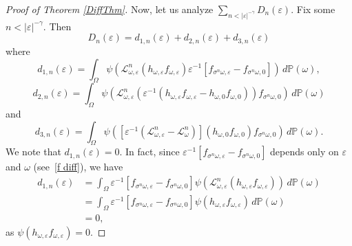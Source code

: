 \documentclass[11pt,reqno,a4paper]{article}
\theoremstyle{special}
\renewcommand{\epsilon}{\varepsilon}
\def\om{\omega}
\begin{document}
\begin{proof}[Proof of Theorem \ref{DiffThm}]
Now, let us analyze $\sum_{n<|\varepsilon|^{-\gamma}}D_n(\varepsilon)$. Fix some $n<|\varepsilon|^{-\gamma}$. 
Then 
$$
D_n(\varepsilon)=d_{1,n}(\varepsilon)+d_{2,n}(\varepsilon)+d_{3,n}(\varepsilon)
$$
where 
$$
d_{1,n}(\varepsilon)=\int_\Omega \psi(\mathcal L_{\omega,\varepsilon}^n(h_{\om, \varepsilon}f_{\om, \varepsilon})\varepsilon^{-1}[f_{\sigma^n\om, \varepsilon}-f_{\sigma^n\om, 0}]) \, d\mathbb P(\om),
$$
$$
d_{2,n}(\varepsilon)=\int_\Omega \psi(\mathcal L_{\om, \varepsilon}^n(\varepsilon^{-1}(h_{\om, \varepsilon}f_{\om, \varepsilon}-h_{\om, 0}f_{\om, 0}))f_{\sigma^n\om, 0})\, d\mathbb P(\om)
$$
and 
$$
d_{3,n}(\varepsilon)=
\int_\Omega \psi([\varepsilon^{-1}(\mathcal L_{\om, \varepsilon}^n-\mathcal L_{\omega}^n)](h_{\om, 0}f_{\om, 0})f_{\sigma^n\om, 0})\, d\mathbb P(\om).
$$
We note that $d_{1, n}(\varepsilon)=0$. In fact, since $\varepsilon^{-1}[f_{\sigma^n \omega, \varepsilon}-f_{\sigma^n \omega, 0}]$ depends only on $\varepsilon$ and $\omega$ (see~\eqref{f diff}), we have 
\[
\begin{split}
d_{1, n}(\varepsilon) &=\int_\Omega \varepsilon^{-1}[f_{\sigma^n\om, \varepsilon}-f_{\sigma^n\om, 0}]  \psi(\mathcal L_{\omega,\varepsilon}^n(h_{\om, \varepsilon}f_{\om, \varepsilon})) \, d\mathbb P(\om) \\
&=\int_\Omega \varepsilon^{-1}[f_{\sigma^n\om, \varepsilon}-f_{\sigma^n\om, 0}]  \psi(h_{\om, \varepsilon}f_{\om, \varepsilon})\, d\mathbb P(\om) \\
&=0,
\end{split}
\]
as $\psi(h_{\omega, \varepsilon}f_{\omega, \varepsilon})=0$.

\end{proof}
\end{document}
